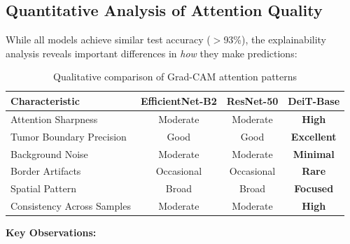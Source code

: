 \subsection{Quantitative Analysis of Attention Quality}

While all models achieve similar test accuracy ($>$93\%), the explainability analysis reveals important differences in \textit{how} they make predictions:

\begin{table}[h]
\centering
\caption{Qualitative comparison of Grad-CAM attention patterns}
\label{tab:gradcam_comparison}
\begin{tabular}{lccc}
\toprule
\textbf{Characteristic} & \textbf{EfficientNet-B2} & \textbf{ResNet-50} & \textbf{DeiT-Base} \\
\midrule
Attention Sharpness & Moderate & Moderate & \textbf{High} \\
Tumor Boundary Precision & Good & Good & \textbf{Excellent} \\
Background Noise & Moderate & Moderate & \textbf{Minimal} \\
Border Artifacts & Occasional & Occasional & \textbf{Rare} \\
Spatial Pattern & Broad & Broad & \textbf{Focused} \\
Consistency Across Samples & Moderate & Moderate & \textbf{High} \\
\bottomrule
\end{tabular}
\end{table}

\textbf{Key Observations:}

